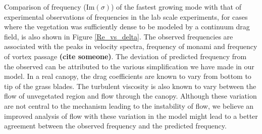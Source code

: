 \documentclass[aps,prl,twocolumn,showpacs,superscriptaddress,groupedaddress,10pt]{revtex4-1}  %
\newcommand{\shreyas}[1]{{\bf (#1)}}
\begin{document}
Comparison of frequency (Im$(\sigma)$) of the fastest growing mode with that of experimental observations of frequencies in the lab scale experiments, for cases where the vegetation was sufficiently dense to be modeled by a continuum drag field, is also shown in Figure \ref{Re_vs_delta}. The observed frequencies are associated with the peaks in velocity spectra, frequency of monami and frequency of vortex passage \shreyas{cite someone}. The deviation of predicted frequency from the observed can be attributed to the various simplification we have made in our model. In a real canopy, the drag coefficients are known to
vary from bottom to tip of the grass blades\cite{Vivoni98,Nepf00}. The turbulent viscosity is also known to vary between the flow of unvegetated region and flow through the canopy. Although these variation
are not central to the mechanism leading to the instability of flow, we believe an improved analysis of flow with these variation in the model might lead to a better agreement between the
observed frequency and the predicted frequency.
\end{document}
